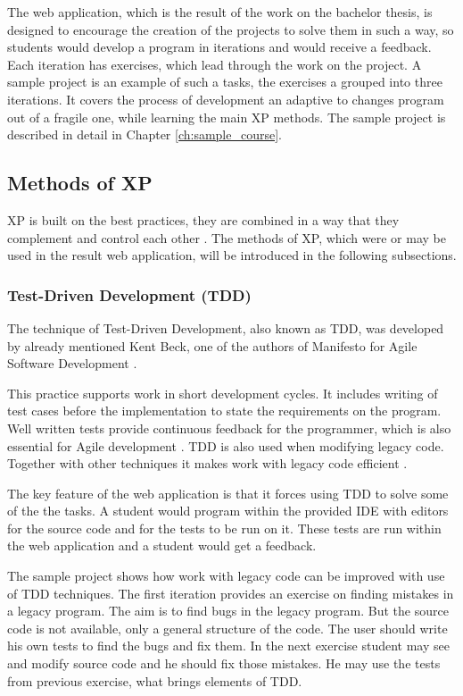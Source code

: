 The web application, which is the result of the work on the bachelor thesis, is designed to encourage the creation of the projects to solve them in such a way, so students would develop a program in iterations and would receive a feedback. Each iteration has exercises, which lead through the work on the project. A sample project is an example of such a tasks, the exercises a grouped into three iterations. It covers the process of development an adaptive to changes program out of a fragile one, while learning the main XP methods. The sample project is described in detail in Chapter \ref{ch:sample_course}.

\subsection{Methods of XP}
XP is built on the best practices, they are combined in a way that they complement and control each other \cite[Foreword]{xp_explained}. The methods of XP, which were or may be used in the result web application, will be introduced in the following subsections.

\subsubsection{Test-Driven Development (TDD)}
The technique of Test-Driven Development, also known as TDD, was developed by already mentioned Kent Beck, one of the authors of Manifesto for Agile Software Development \cite{tdd_example}.

This practice supports work in short development cycles. It includes writing of test cases before the implementation to state the requirements on the program. Well written tests provide continuous feedback for the programmer, which is also essential for Agile development \cite{tdd_dp}. TDD is also used when modifying legacy code. Together with other techniques it makes work with legacy code efficient \cite[Test-Driven Development (TDD)]{lc_effectively}.

The key feature of the web application is that it forces using TDD to solve some of the the tasks. A student would program within the provided IDE with editors for the source code and for the tests to be run on it. These tests are run within the web application and a student would get a feedback.

The sample project shows how work with legacy code can be improved with use of TDD techniques. The first iteration provides an exercise on finding mistakes in a legacy program. The aim is to find bugs in the legacy program. But the source code is not available, only a general structure of the code. The user should write his own tests to find the bugs and fix them. In the next exercise student may see and modify source code and he should fix those mistakes. He may use the tests from previous exercise, what brings elements of TDD.

